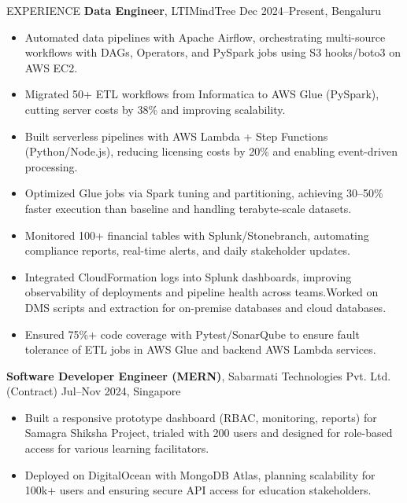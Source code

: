 \documentclass[10pt]{resume}
\begin{document}
\begin{rSection}{EXPERIENCE}
\textbf{Data Engineer}, LTIMindTree \hfill Dec 2024--Present, Bengaluru
\begin{itemize}
    \item Automated data pipelines with Apache Airflow, orchestrating multi-source workflows with DAGs, Operators, and PySpark jobs using S3 hooks/boto3 on AWS EC2.
    \item Migrated 50+ ETL workflows from Informatica to AWS Glue (PySpark), cutting server costs by 38\% and improving scalability.
    \item Built serverless pipelines with AWS Lambda + Step Functions (Python/Node.js), reducing licensing costs by 20\% and enabling event-driven processing.
    \item Optimized Glue jobs via Spark tuning and partitioning, achieving 30--50\% faster execution than baseline and handling terabyte-scale datasets.
    \item Monitored 100+ financial tables with Splunk/Stonebranch, automating compliance reports, real-time alerts, and daily stakeholder updates.
    \item Integrated CloudFormation logs into Splunk dashboards, improving observability of deployments and pipeline health across teams.Worked on DMS scripts and extraction for on-premise databases and cloud databases.
    \item Ensured 75\%+ code coverage with Pytest/SonarQube to ensure fault tolerance of ETL jobs in AWS Glue and backend AWS Lambda services.
\end{itemize}

\textbf{Software Developer Engineer (MERN)}, Sabarmati Technologies Pvt. Ltd. (Contract) \hfill Jul--Nov 2024, Singapore
\begin{itemize}
    \item Built a responsive  prototype dashboard (RBAC, monitoring, reports) for Samagra Shiksha Project, trialed with 200 users and designed for role-based access for various learning facilitators.
    \item Deployed on DigitalOcean with MongoDB Atlas, planning scalability for 100k+ users and ensuring secure API access for education stakeholders.
\end{itemize}


\end{rSection}
\end{document}
